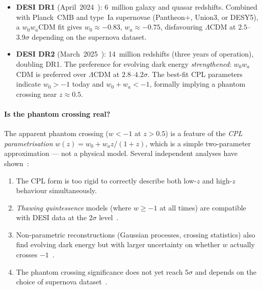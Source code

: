 \documentclass[11pt,a4paper]{article}
\numberwithin{equation}{section}
\begin{document}
\begin{itemize}
\item \textbf{DESI DR1} (April~2024~\cite{DESI2024}):
  6~million galaxy and quasar redshifts.
  Combined with Planck~CMB and type~Ia supernovae
  (Pantheon+, Union3, or DESY5), a $w_0w_a$CDM fit
  gives $w_0 \approx -0.83$, $w_a \approx -0.75$,
  disfavouring $\Lambda$CDM at $2.5$--$3.9\sigma$
  depending on the supernova dataset.

\item \textbf{DESI DR2} (March~2025~\cite{DESIDR2_2025}):
  14~million redshifts (three years of operation),
  doubling DR1.  The preference for evolving dark energy
  \emph{strengthened}: $w_0w_a$CDM is preferred over
  $\Lambda$CDM at $2.8$--$4.2\sigma$.  The best-fit
  CPL parameters indicate $w_0 > -1$ today and
  $w_0 + w_a < -1$, formally implying a phantom crossing
  near $z \approx 0.5$.
\end{itemize}

\paragraph{Is the phantom crossing real?}
The apparent phantom crossing ($w < -1$ at $z > 0.5$) is
a feature of the \emph{CPL parametrisation}
$w(z) = w_0 + w_a z/(1+z)$, which is a simple two-parameter
approximation --- not a physical model.  Several independent
analyses have shown~\cite{Lodha2025,Calderon2024}:

\begin{enumerate}
\item The CPL form is too rigid to correctly describe both
  low-$z$ and high-$z$ behaviour simultaneously.

\item \emph{Thawing quintessence} models (where
  $w \geq -1$ at all times) are compatible with DESI data
  at the $2\sigma$ level~\cite{Shlivko2024,Gomez2025}.

\item Non-parametric reconstructions (Gaussian processes,
  crossing statistics) also find evolving dark energy but
  with larger uncertainty on whether $w$ actually crosses
  $-1$~\cite{Calderon2024}.

\item The phantom crossing significance does not yet reach
  $5\sigma$ and depends on the choice of supernova
  dataset~\cite{Wang2025}.
\end{enumerate}
\end{document}
